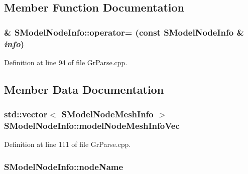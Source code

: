 \subsection{Member Function Documentation}
\hypertarget{struct_s_model_node_info_ffc051915ca9fb7eab93269b2504aaac}{
\subsubsection[{operator=}]{\& SModelNodeInfo::operator= (const {\bf SModelNodeInfo} \& {\em info})}}
\label{struct_s_model_node_info_ffc051915ca9fb7eab93269b2504aaac}




Definition at line 94 of file GrParse.cpp.

\subsection{Member Data Documentation}
\hypertarget{struct_s_model_node_info_ca20ee9540ca1d18dc8e7f2a1aa2bdbe}{
\subsubsection[{modelNodeMeshInfoVec}]{\setlength{\rightskip}{0pt plus 5cm}std::vector$<$ {\bf SModelNodeMeshInfo} $>$ {\bf SModelNodeInfo::modelNodeMeshInfoVec}}}
\label{struct_s_model_node_info_ca20ee9540ca1d18dc8e7f2a1aa2bdbe}




Definition at line 111 of file GrParse.cpp.\hypertarget{struct_s_model_node_info_02679f64cd6fbb25ea3aa422f475161f}{
\subsubsection[{nodeName}]{ {\bf SModelNodeInfo::nodeName}}}
\label{struct_s_model_node_info_02679f64cd6fbb25ea3aa422f475161f}





